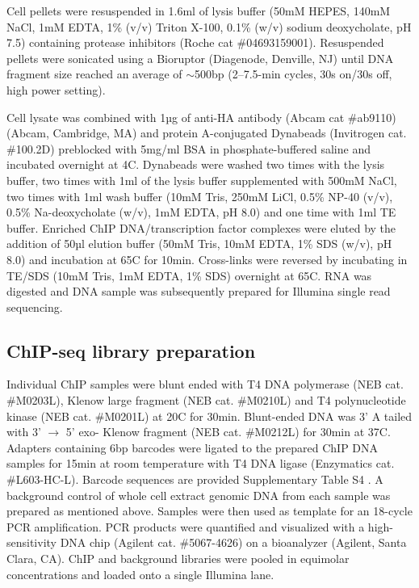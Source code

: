 Cell pellets were resuspended in 1.6ml of lysis buffer (50mM HEPES, 140mM NaCl, 1mM EDTA, 1\% (v/v) Triton X-100, 0.1\% (w/v) sodium deoxycholate, pH 7.5) containing protease inhibitors (Roche cat \#04693159001). Resuspended pellets were sonicated using a Bioruptor (Diagenode, Denville, NJ) until DNA fragment size reached an average of $\sim$500bp (2–7.5-min cycles, 30s on/30s off, high power setting).

Cell lysate was combined with 1µg of anti-HA antibody (Abcam cat \#ab9110) (Abcam, Cambridge, MA) and protein A-conjugated Dynabeads (Invitrogen cat. \#100.2D) preblocked with 5mg/ml BSA in phosphate-buffered saline and incubated overnight at 4\degree C. Dynabeads were washed two times with the lysis buffer, two times with 1ml of the lysis buffer supplemented with 500mM NaCl, two times with 1ml wash buffer (10mM Tris, 250mM LiCl, 0.5\% NP-40 (v/v), 0.5\% Na-deoxycholate (w/v), 1mM EDTA, pH 8.0) and one time with 1ml TE buffer. Enriched ChIP DNA/transcription factor complexes were eluted by the addition of 50µl elution buffer (50mM Tris, 10mM EDTA, 1\% SDS (w/v), pH 8.0) and incubation at 65\degree C for 10min. Cross-links were reversed by incubating in TE/SDS (10mM Tris, 1mM EDTA, 1\% SDS) overnight at 65\degree C. RNA was digested and DNA sample was subsequently prepared for Illumina single read sequencing.

\subsection{ChIP-seq library preparation}

Individual ChIP samples were blunt ended with T4 DNA polymerase (NEB cat. \#M0203L), Klenow large fragment (NEB cat. \#M0210L) and T4 polynucleotide kinase (NEB cat. \#M0201L) at 20\degree C for 30min. Blunt-ended DNA was 3' A tailed with 3' $\rightarrow$ 5' exo- Klenow fragment (NEB cat. \#M0212L) for 30min at 37\degree C. Adapters containing 6bp barcodes were ligated to the prepared ChIP DNA samples for 15min at room temperature with T4 DNA ligase (Enzymatics cat. \#L603-HC-L). Barcode sequences are provided Supplementary Table S4 . A background control of whole cell extract genomic DNA from each sample was prepared as mentioned above. Samples were then used as template for an 18-cycle PCR amplification. PCR products were quantified and visualized with a high-sensitivity DNA chip (Agilent cat. \#5067-4626) on a bioanalyzer (Agilent, Santa Clara, CA). ChIP and background libraries were pooled in equimolar concentrations and loaded onto a single Illumina lane.

